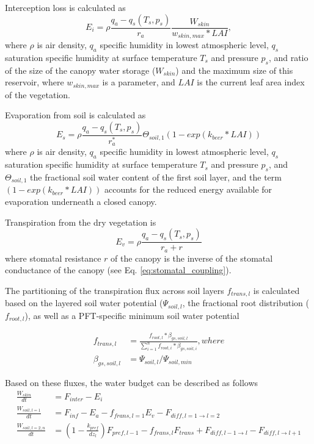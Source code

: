 Interception loss is calculated as 
\begin{equation}
E_{i}=\rho\frac{q_{a}-q_{s}(T_{s},p_{s})}{r_{a}} \frac{W_{skin}}{w_{skin,max} * LAI},
\end{equation}
where $\rho$ is air density, $q_{a}$ specific humidity in lowest atmospheric level, $q_{s}$ saturation specific humidity at surface temperature $T_{s}$ and pressure $p_{s}$, and ratio of the size of the canopy water storage ($W_{skin}$) and the maximum size of this reservoir, where $w_{skin,max}$ is a parameter, and $LAI$ is the current leaf area index of the vegetation. 

Evaporation from soil is calculated as 
\begin{equation}
E_{s}=\rho\frac{q_{a}-q_{s}(T_{s},p_{s})}{r^*_{a}} \Theta_{soil,1} (1-exp(k_{beer}*LAI))
\end{equation}
where $\rho$ is air density, $q_{a}$ specific humidity in lowest atmospheric level, $q_{s}$ saturation specific humidity at surface temperature $T_{s}$ and pressure $p_{s}$, and $\Theta_{soil,1}$ the fractional soil water content of the first soil layer, and the term $(1-exp(k_{beer}*LAI))$ accounts for the reduced energy available for evaporation underneath a closed canopy. 

Transpiration from the dry vegetation is
\begin{equation}
E_{v}=\rho\frac{q_{a}-q_{s}(T_{s},p_{s})}{r_{a}+r}
\end{equation}
where stomatal resistance $r$ of the canopy is the inverse of the stomatal conductance of the canopy (see Eq. \ref{eq:stomatal_coupling}).


The partitioning of the transpiration flux across soil layers $f_{trans,l}$ is calculated based on the layered soil water potential ($\Psi_{soil,l}$, the fractional root distribution ($f_{root,l}$), as well as a PFT-specific minimum soil water potential
 
\begin{subequations}
\begin{align}
f_{trans,l} &= \frac{f_{root,l} * \beta_{gs,soil,l}}{ \sum\limits_{i=1}^n f_{root,i} * \beta_{gs,soil,i}} , where \\
 \beta_{gs,soil,l} &= \Psi_{soil,l} / \Psi_{soil,min}
\end{align}
\end{subequations}

Based on these fluxes, the water budget can be described as follows
\begin{subequations}
\begin{align}
\frac{W_{skin}}{dt} &= F_{inter} - E_{i} \\
\frac{W_{soil,l=1}}{dt} &= F_{inf} - E_{a} - f_{frans,l=1} E_{v} - F_{diff,l=1 \rightarrow l=2} \\
\frac{W_{soil,l=2,n}}{dt} &= (1 - \frac{k_{pref}}{dz_l}) F_{pref,l-1} - f_{frans,l} F_{trans} + F_{diff,l-1 \rightarrow l} - F_{diff,l \rightarrow l+1} \\
\end{align}
\end{subequations}

